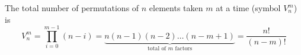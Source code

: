 \documentclass{article}
\begin{document}
\noindent
The total number of permutations of $n$ elements taken $m$ at a time
(symbol $V_n^m$) is
\vspace{-0.5ex}
\[ V_n^m = \prod_{i=0}^{m-1}(n-i) = 
  \underbrace{n(n-1)(n-2)\ldots(n-m+1)}_{\mbox{total of $m$ factors}} =
  \frac{n!}{(n-m)!} \]
\end{document}
